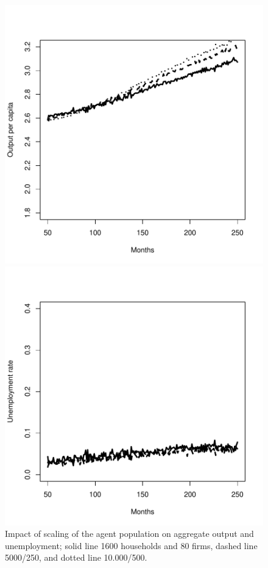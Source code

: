 \begin{figure}[t]
\begin{minipage}[b]{.46\linewidth}
\centering\includegraphics[scale =0.4]{./robustness/gdp_scaling.pdf}
\end{minipage}\hfill
\begin{minipage}[b]{.46\linewidth}
\centering\includegraphics[scale=0.4]{./robustness/unemployment_scaling.pdf}
\end{minipage}
\caption{Impact of scaling of the agent population on aggregate output and unemployment; solid line 1600 households and 80 firms, dashed line 5000/250, and dotted line 10.000/500.}
\label{scaling_variation}
\end{figure}
